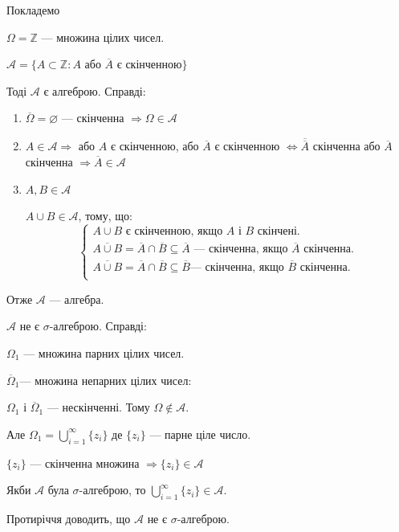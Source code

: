 \begin{example}
    Покладемо 
    
    $\Omega = \mathbb{Z}$ --- множина цілих чисел.
    
    $\mathcal{A} = \{ A \subset \mathbb{Z}: A$ або $\overline{A}$ є скінченною$\}$
    
    Тоді $\mathcal{A}$ є алгеброю. Справді:
    
    \begin{enumerate}
        \item $\overline{\Omega} = \varnothing$ --- скінченна $\Rightarrow \Omega \in \mathcal{A}$
        
        \item $A \in \mathcal{A} \Rightarrow$ або $A$ є скінченною, або $\overline{A}$ є скінченною 
        $\Leftrightarrow \overline{\overline{A}}$ скінченна або $\overline{A}$ скінченна
        $\Rightarrow \overline{A} \in \mathcal{A}$
    
        \item $A, B \in \mathcal{A}$
        
        $A \cup B \in \mathcal{A}$, тому, що:
        $$\left\{ \begin{array}{l}
            A \cup B \text{ є скінченною, якщо } A \text{ і } B \text{ скінчені.}  \\ 
            
            \overline{A \cup B} = \overline{A} \cap \overline{B} \subseteq \overline{A}
            \text{ --- скінченна, якщо } \overline{A} \text{ скінченна.}  \\
    
            \overline{A \cup B} = \overline{A} \cap \overline{B} \subseteq \overline{B}
            \text{--- скінченна, якщо } \overline{B} \text{ скінченна.}  \\
        \end{array} \right.$$
    \end{enumerate}
    
    Отже $\mathcal{A}$ --- алгебра.
    
    $\mathcal{A}$ не є $\sigma$-алгеброю. Справді:
    
    $\Omega_1$ --- множина парних цілих чисел.
    
    $\overline{\Omega}_1$--- множина непарних цілих чисел:
    
    $\Omega_1$ і $\overline{\Omega}_1$ --- нескінченні. Тому
    $\Omega \notin \mathcal{A}$.
    
    Але $\Omega_1 = \bigcup\limits_{i=1}^{\infty} \{ z_i \}$
    де $\{z_i\}$ --- парне ціле число.
    
    $\{z_i\}$ --- скінченна множина $\Rightarrow \{z_i\} \in \mathcal{A}$
    
    Якби $\mathcal{A}$ була $\sigma$-алгеброю, то
    $\bigcup\limits_{i=1}^{\infty} \{z_i\} \in \mathcal{A}$.
    
    Протиріччя доводить, що $\mathcal{A}$ не є $\sigma$-алгеброю.
\end{example}

